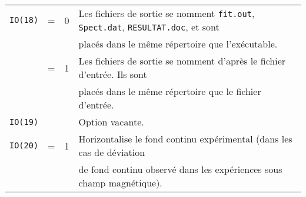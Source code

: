 \begin{table}
\begin{tabular}{|rcl|l|}
\hline  
\lstinline{IO(18)}&=& 0 & Les fichiers de sortie se nomment \lstinline{fit.out}, \lstinline{Spect.dat}, \lstinline{RESULTAT.doc}, et sont\\
                  & &   & placés dans le même répertoire que l'exécutable.\\
                  &=& 1 & Les fichiers de sortie se nomment d'après le fichier d'entrée. Ils sont \\
                  & &   & placés dans le même répertoire que le fichier d'entrée.\\
\hline  
\lstinline{IO(19)}& &   & Option vacante.\\
\hline  
\lstinline{IO(20)}&=&1 & Horizontalise le fond continu expérimental (dans les cas de déviation \\
                  & &  & de fond continu observé dans les expériences sous champ magnétique).\\
\hline  
\end{tabular}
\end{table}



\FloatBarrier
